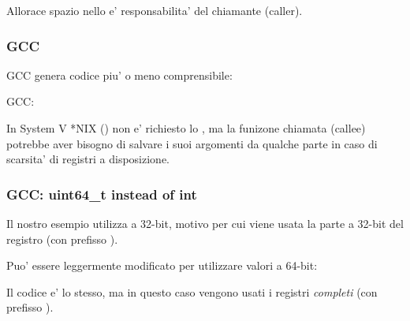 Allorace spazio nello  e' responsabilita' del chiamante (\gls{caller}).

\subsubsection{GCC}

\Optimizing GCC genera codice piu' o meno comprensibile:



\NonOptimizing GCC:




In System V *NIX (\SysVABI) non e' richiesto lo , ma la funizone chiamata (\gls{callee}) potrebbe aver bisogno di salvare
i suoi argomenti da qualche parte in caso di scarsita' di registri a disposizione.

\subsubsection{GCC: uint64\_t instead of int}

Il nostro esempio utilizza \Tint a 32-bit, motivo per cui viene usata la parte a 32-bit del registro (con prefisso ).

Puo' essere leggermente modificato per utilizzare valori a 64-bit:





Il codice e' lo stesso, ma in questo caso vengono usati i registri \emph{completi} (con prefisso ).
